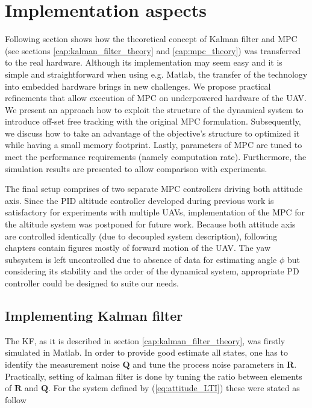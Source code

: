 \section{Implementation aspects}
\label{cap:Implementation}

Following section shows how the theoretical concept of Kalman filter and MPC (see sections \ref{cap:kalman_filter_theory} and \ref{cap:mpc_theory}) was transferred to the real hardware. Although its implementation may seem easy and it is simple and straightforward when using e.g. Matlab, the transfer of the technology into embedded hardware brings in new challenges. We propose practical refinements that allow execution of MPC on underpowered hardware of the UAV. We present an approach how to exploit the structure of the dynamical system to introduce off-set free tracking with the original MPC formulation. Subsequently, we discuss how to take an advantage of the objective's structure to optimized it while having a small memory footprint. Lastly, parameters of MPC are tuned to meet the performance requirements (namely computation rate). Furthermore, the simulation results are presented to allow comparison with experiments.

The final setup comprises of two separate MPC controllers driving both attitude axis. Since the PID altitude controller developed during previous work \citep{endrych2014} is satisfactory for experiments with multiple UAVs, implementation of the MPC for the altitude system was postponed for future work. Because both attitude axis are controlled identically (due to decoupled system description), following chapters contain figures mostly of forward motion of the UAV. The yaw subsystem is left uncontrolled due to absence of data for estimating angle $\phi$ but considering its stability and the order of the dynamical system, appropriate PD controller could be designed to suite our needs.

\subsection{Implementing Kalman filter}

The KF, as it is described in section \ref{cap:kalman_filter_theory}, was firstly simulated in Matlab. In order to provide good estimate all states, one has to identify the measurement noise $\textbf{Q}$ and tune the process noise parameters in \textbf{R}. Practically, setting of kalman filter is done by tuning the ratio between elements of $\textbf{R}$ and $\textbf{Q}$. For the system defined by (\ref{eq:attitude_LTI}) these were stated as follow

